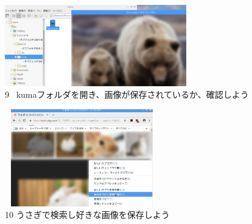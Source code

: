 \documentclass[a4paper,12pt]{jarticle}
\begin{document}
\begin{figure}[t]
\begin{minipage}{\textwidth}
\begin{minipage}{7.882cm}
\includegraphics[width=7.872cm,height=3.54cm]{textbook-img102.png}\\
9 \ kumaフォルダを開き、画像が保存されているか、確認しよう
\end{minipage}
\begin{minipage}{2.582cm}
\end{minipage}
\begin{minipage}{6.582cm}
\includegraphics[width=6.71cm,height=4.228cm]{textbook-img101.png}\\
10 うさぎで検索し好きな画像を保存しよう
\end{minipage}
\end{minipage}

	\vspace{60mm}

\end{figure}



\bigskip



\clearpage
\end{document}
